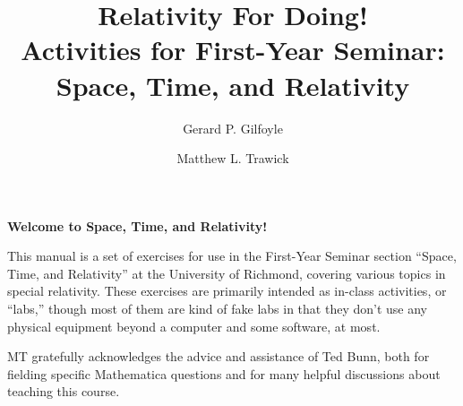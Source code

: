 

\title{Relativity For Doing!\\
Activities for First-Year Seminar: Space, Time, and Relativity}

\author{Gerard P. Gilfoyle}
\author{Matthew L. Trawick}

\maketitle

\vspace{0.8 in}


\begin{center}
\large{\textbf{Welcome to Space, Time, and Relativity!}}
\end{center}


This manual is a set of exercises for use in the First-Year Seminar section ``Space, Time, and Relativity'' at the University of Richmond, covering various topics in special relativity.  These exercises are primarily intended as in-class activities, or ``labs,'' though most of them are kind of fake labs in that they don't use any physical equipment beyond a computer and some software, at most.

MT gratefully acknowledges the advice and assistance of Ted Bunn, both for fielding specific Mathematica questions and for many helpful discussions about teaching this course.



\newpage
\
\thispagestyle{plain}

\newpage
\
